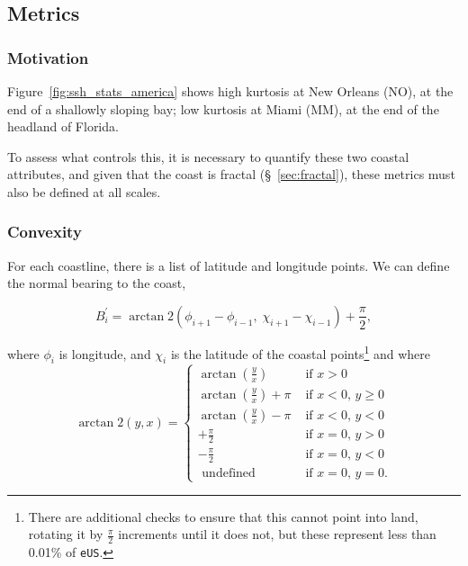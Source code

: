 

\subsection{Metrics}
\subsubsection{Motivation}
Figure~\ref{fig:ssh_stats_america} shows
high kurtosis at New Orleans (NO), at the end of a shallowly sloping bay;
low kurtosis at Miami (MM), at the end of the headland of Florida.

To assess what controls this,
it is necessary to quantify these two coastal attributes,
and given that the coast is fractal (§~\ref{sec:fractal}),
these metrics must also be defined at all scales.

\subsubsection{Convexity}
\label{sec:convexity}

For each coastline,
there is a list of latitude and longitude points.
We can define the normal bearing to the coast,

\begin{equation}
B_i^{\prime}=\operatorname{arctan} 2
\left(\phi_{i+1}-\phi_{i-1},\; \chi_{i+1}-\chi_{i-1}\right) +\frac{\pi}{2},
\label{eq:bearing}
\end{equation}

where $\phi_{i}$ is longitude, and $\chi_{i}$ is the latitude of the coastal points\footnote{
There are additional checks to ensure that this cannot point into land,
rotating it by $\frac{\pi}{2}$ increments until it does not,
but these represent less than 0.01\% of \texttt{eUS}.}
and where \begin{equation}
\operatorname{arctan} 2(y, x)=\left\{\begin{array}{ll}
\arctan \left(\frac{y}{x}\right) & \text { if } x>0 \\
\arctan \left(\frac{y}{x}\right)+\pi & \text { if } x<0 \text {, } y \geq 0 \\
\arctan \left(\frac{y}{x}\right)-\pi & \text { if } x<0 \text {, } y<0 \\
+\frac{\pi}{2} & \text { if } x=0 \text {, } y>0 \\
-\frac{\pi}{2} & \text { if } x=0 \text {, } y<0 \\
\text { undefined } & \text { if } x=0 \text {, } y=0.
\end{array}\right.
\end{equation}

